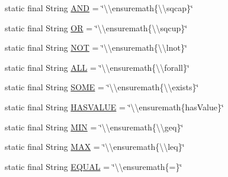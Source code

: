 \begin{DoxyCompactItemize}
\item 
static final String \hyperlink{classorg_1_1coode_1_1owlapi_1_1latex_1_1_latex_object_visitor_a10b0eb0b9cac207068ca8e4c3b94d246}{A\-N\-D} = \char`\"{}\textbackslash{}\textbackslash{}ensuremath\{\textbackslash{}\textbackslash{}sqcap\}\char`\"{}
\item 
static final String \hyperlink{classorg_1_1coode_1_1owlapi_1_1latex_1_1_latex_object_visitor_a0f40cd0185b366866cb0dd8d6e839c69}{O\-R} = \char`\"{}\textbackslash{}\textbackslash{}ensuremath\{\textbackslash{}\textbackslash{}sqcup\}\char`\"{}
\item 
static final String \hyperlink{classorg_1_1coode_1_1owlapi_1_1latex_1_1_latex_object_visitor_a483b7302ce10c1f13cacf5923c0416c5}{N\-O\-T} = \char`\"{}\textbackslash{}\textbackslash{}ensuremath\{\textbackslash{}\textbackslash{}lnot\}\char`\"{}
\item 
static final String \hyperlink{classorg_1_1coode_1_1owlapi_1_1latex_1_1_latex_object_visitor_aacbf85b86083d87fc52694c207237652}{A\-L\-L} = \char`\"{}\textbackslash{}\textbackslash{}ensuremath\{\textbackslash{}\textbackslash{}forall\}\char`\"{}
\item 
static final String \hyperlink{classorg_1_1coode_1_1owlapi_1_1latex_1_1_latex_object_visitor_abf56b16cbf16f3954e1217894fe6b4f5}{S\-O\-M\-E} = \char`\"{}\textbackslash{}\textbackslash{}ensuremath\{\textbackslash{}\textbackslash{}exists\}\char`\"{}
\item 
static final String \hyperlink{classorg_1_1coode_1_1owlapi_1_1latex_1_1_latex_object_visitor_a514df52f2591a7330b7f276bd83c59fb}{H\-A\-S\-V\-A\-L\-U\-E} = \char`\"{}\textbackslash{}\textbackslash{}ensuremath\{has\-Value\}\char`\"{}
\item 
static final String \hyperlink{classorg_1_1coode_1_1owlapi_1_1latex_1_1_latex_object_visitor_af62cc0818a811e4f2ae0a24c6f4911bd}{M\-I\-N} = \char`\"{}\textbackslash{}\textbackslash{}ensuremath\{\textbackslash{}\textbackslash{}geq\}\char`\"{}
\item 
static final String \hyperlink{classorg_1_1coode_1_1owlapi_1_1latex_1_1_latex_object_visitor_a9499ba545098f6782c3bdbfeb63325e4}{M\-A\-X} = \char`\"{}\textbackslash{}\textbackslash{}ensuremath\{\textbackslash{}\textbackslash{}leq\}\char`\"{}
\item 
static final String \hyperlink{classorg_1_1coode_1_1owlapi_1_1latex_1_1_latex_object_visitor_aaf9ce32d47057c4d9ffe3549223ab128}{E\-Q\-U\-A\-L} = \char`\"{}\textbackslash{}\textbackslash{}ensuremath\{=\}\char`\"{}

\end{DoxyCompactItemize}
